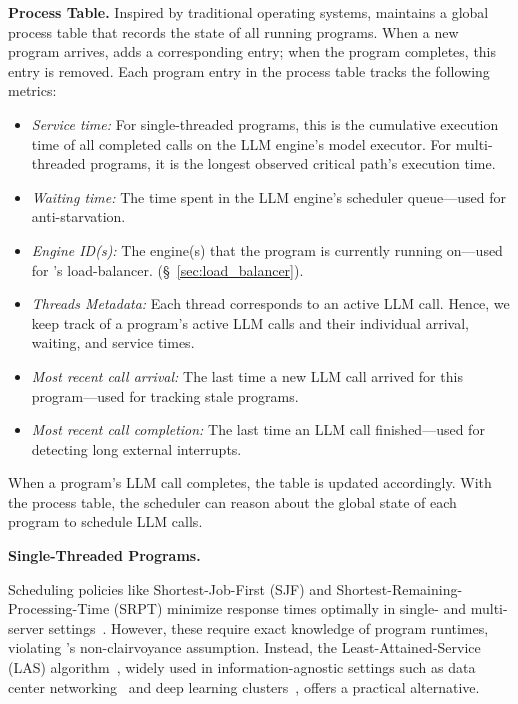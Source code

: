 \vspace{1.5mm}
\noindent \textbf{Process Table.} Inspired by traditional operating systems, \text{\name} maintains a global process table that records the state of all running programs. When a new program arrives, \text{\name} adds a corresponding entry; when the program completes, this entry is removed. Each program entry in the process table tracks the following metrics:
\begin{itemize}[itemsep=0pt, parsep=0pt, topsep=0pt, partopsep=0pt, leftmargin=*]
    \item \textit{Service time:} For single-threaded programs, this is the cumulative execution time of all completed calls on the LLM engine's model executor. For multi-threaded programs, it is the longest observed critical path's execution time.
    \item \textit{Waiting time:} The time spent in the LLM engine's scheduler queue—used for anti-starvation.
    \item \textit{Engine ID(s):} The engine(s) that the program is currently running on—used for \text{\name}'s load-balancer. (\S~\ref{sec:load_balancer}).
    \item \textit{Threads Metadata:} Each thread corresponds to an active LLM call. Hence, we keep track of a program's active LLM calls and their individual arrival, waiting, and service times. 
    \item \textit{Most recent call arrival:} The last time a new LLM call arrived for this program—used for tracking stale programs.
    \item \textit{Most recent call completion:} The last time an LLM call finished—used for detecting long external interrupts.
\end{itemize}
When a program's LLM call completes, the table is updated accordingly. With the process table, the scheduler can reason about the global state of each program to schedule LLM calls.

\vspace{1.5mm}
\noindent \textbf{Single-Threaded Programs.}

Scheduling policies like Shortest-Job-First (SJF) and Shortest-Remaining-Processing-Time (SRPT) minimize response times optimally in single- and multi-server settings~\cite{srpt_optimal, sjf_optimal}. However, these require exact knowledge of program runtimes, violating \text{\name}'s non-clairvoyance assumption. Instead, the Least-Attained-Service (LAS) algorithm~\cite{las}, widely used in information-agnostic settings such as data center networking~\cite{las_datacenter, coflow_dag} and deep learning clusters~\cite{tiresias}, offers a practical alternative.

